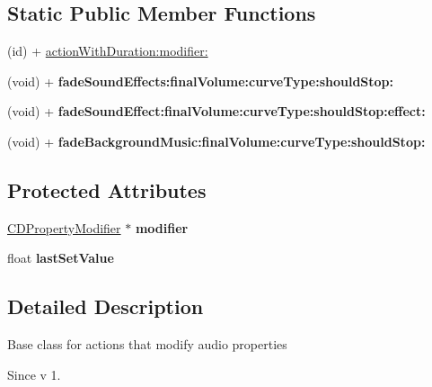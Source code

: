 \subsection*{Static Public Member Functions}
\begin{DoxyCompactItemize}
\item 
(id) + \hyperlink{interface_c_d_x_property_modifier_action_a46d04d4a1c089a70f9d6d4a5dfce2fa9}{action\-With\-Duration\-:modifier\-:}
\item 
\hypertarget{interface_c_d_x_property_modifier_action_aed148233eb81e742d2303752627ad12e}{(void) + {\bfseries fade\-Sound\-Effects\-:final\-Volume\-:curve\-Type\-:should\-Stop\-:}}\label{interface_c_d_x_property_modifier_action_aed148233eb81e742d2303752627ad12e}

\item 
\hypertarget{interface_c_d_x_property_modifier_action_abcb7eeef46cbaf3b005e7495ebdb67b1}{(void) + {\bfseries fade\-Sound\-Effect\-:final\-Volume\-:curve\-Type\-:should\-Stop\-:effect\-:}}\label{interface_c_d_x_property_modifier_action_abcb7eeef46cbaf3b005e7495ebdb67b1}

\item 
\hypertarget{interface_c_d_x_property_modifier_action_a6963b01463da78d769c6fb8f3524f528}{(void) + {\bfseries fade\-Background\-Music\-:final\-Volume\-:curve\-Type\-:should\-Stop\-:}}\label{interface_c_d_x_property_modifier_action_a6963b01463da78d769c6fb8f3524f528}

\end{DoxyCompactItemize}
\subsection*{Protected Attributes}
\begin{DoxyCompactItemize}
\item 
\hypertarget{interface_c_d_x_property_modifier_action_a03a99d8be34bf86be9f36a718d6ce64c}{\hyperlink{interface_c_d_property_modifier}{C\-D\-Property\-Modifier} $\ast$ {\bfseries modifier}}\label{interface_c_d_x_property_modifier_action_a03a99d8be34bf86be9f36a718d6ce64c}

\item 
\hypertarget{interface_c_d_x_property_modifier_action_a8e2a5a8236507e3f8924bfd018d36c84}{float {\bfseries last\-Set\-Value}}\label{interface_c_d_x_property_modifier_action_a8e2a5a8236507e3f8924bfd018d36c84}

\end{DoxyCompactItemize}


\subsection{Detailed Description}
Base class for actions that modify audio properties \begin{DoxySince}{Since}
v 1. 
\end{DoxySince}


